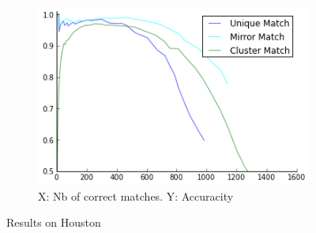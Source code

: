 \documentclass{article}
\begin{document}
\begin{figure}
{\begin{subfigure}[t]{0.35\textwidth}
			\centering
			\includegraphics[width=\textwidth]{images/result_houston}
			\caption{X: Nb of correct matches. Y: Accuracity}
			\label{fig:result_houston}
		\end{subfigure}%
	}%
	\label{fig:houston}
	\caption{Results on Houston}
\end{figure}
\end{document}
